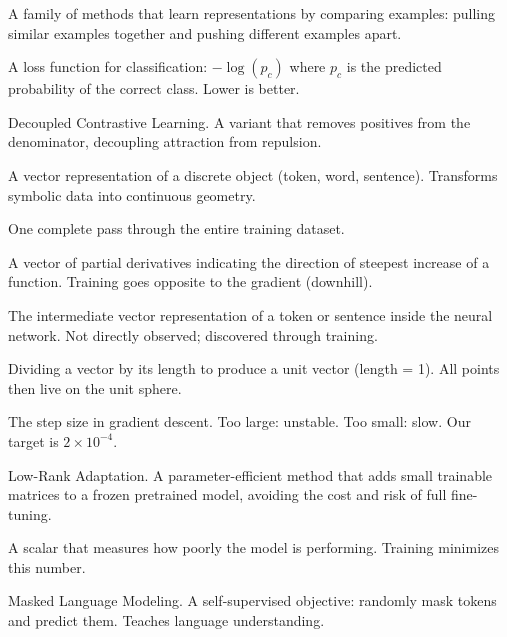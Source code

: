 \documentclass[11pt,a4paper]{article}
\theoremstyle{definition}
\begin{document}
\begin{description}[style=nextline, leftmargin=3.5cm, font=\bfseries]
  \item[Contrastive learning]
    A family of methods that learn representations by comparing
    examples: pulling similar examples together and pushing different
    examples apart.

  \item[Cross-entropy]
    A loss function for classification: $-\log(p_c)$ where $p_c$ is
    the predicted probability of the correct class. Lower is better.

  \item[DCL]
    Decoupled Contrastive Learning. A variant that removes positives
    from the denominator, decoupling attraction from repulsion.

  \item[Embedding]
    A vector representation of a discrete object (token, word,
    sentence). Transforms symbolic data into continuous geometry.

  \item[Epoch]
    One complete pass through the entire training dataset.

  \item[Gradient]
    A vector of partial derivatives indicating the direction of
    steepest increase of a function. Training goes opposite to the
    gradient (downhill).

  \item[Hidden state]
    The intermediate vector representation of a token or sentence
    inside the neural network. Not directly observed; discovered
    through training.

  \item[L2-normalization]
    Dividing a vector by its length to produce a unit vector (length =
    1). All points then live on the unit sphere.

  \item[Learning rate]
    The step size in gradient descent. Too large: unstable. Too small:
    slow. Our target is $2 \times 10^{-4}$.

  \item[LoRA]
    Low-Rank Adaptation. A parameter-efficient method that adds small
    trainable matrices to a frozen pretrained model, avoiding the cost
    and risk of full fine-tuning.

  \item[Loss function]
    A scalar that measures how poorly the model is performing. Training
    minimizes this number.

  \item[MLM]
    Masked Language Modeling. A self-supervised objective: randomly
    mask tokens and predict them. Teaches language understanding.


\end{description}
\end{document}
